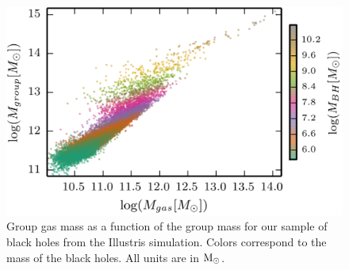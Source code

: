 \begin{figure}
\begin{centering}
\includegraphics{Figures/Mgroup_vs_Mgas}
\par\end{centering}

\protect\caption{\label{fig:mgroup_vs_mgas}Group gas mass as a function of the group
mass for our sample of black holes from the Illustris simulation.
Colors correspond to the mass of the black holes. All units are in
${\rm M_{\odot}}$.}


\end{figure}
